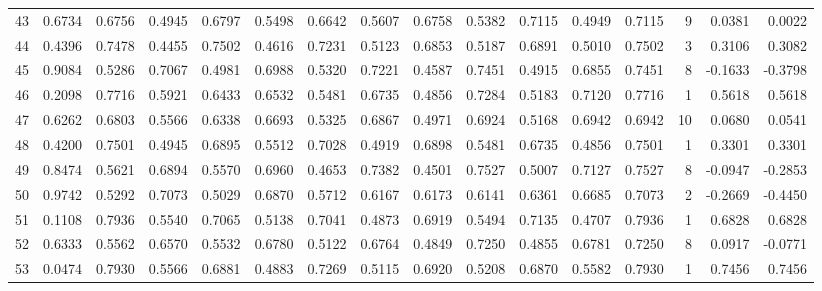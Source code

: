 \begin{tabular}{lrrrrrrrrrrrrrrr}
43  &      0.6734 &  0.6756 &  0.4945 &  0.6797 &  0.5498 &  0.6642 &  0.5607 &  0.6758 &  0.5382 &  0.7115 &   0.4949 &     0.7115 &      9 &                    0.0381 &                     0.0022 \\
44  &      0.4396 &  0.7478 &  0.4455 &  0.7502 &  0.4616 &  0.7231 &  0.5123 &  0.6853 &  0.5187 &  0.6891 &   0.5010 &     0.7502 &      3 &                    0.3106 &                     0.3082 \\
45  &      0.9084 &  0.5286 &  0.7067 &  0.4981 &  0.6988 &  0.5320 &  0.7221 &  0.4587 &  0.7451 &  0.4915 &   0.6855 &     0.7451 &      8 &                   -0.1633 &                    -0.3798 \\
46  &      0.2098 &  0.7716 &  0.5921 &  0.6433 &  0.6532 &  0.5481 &  0.6735 &  0.4856 &  0.7284 &  0.5183 &   0.7120 &     0.7716 &      1 &                    0.5618 &                     0.5618 \\
47  &      0.6262 &  0.6803 &  0.5566 &  0.6338 &  0.6693 &  0.5325 &  0.6867 &  0.4971 &  0.6924 &  0.5168 &   0.6942 &     0.6942 &     10 &                    0.0680 &                     0.0541 \\
48  &      0.4200 &  0.7501 &  0.4945 &  0.6895 &  0.5512 &  0.7028 &  0.4919 &  0.6898 &  0.5481 &  0.6735 &   0.4856 &     0.7501 &      1 &                    0.3301 &                     0.3301 \\
49  &      0.8474 &  0.5621 &  0.6894 &  0.5570 &  0.6960 &  0.4653 &  0.7382 &  0.4501 &  0.7527 &  0.5007 &   0.7127 &     0.7527 &      8 &                   -0.0947 &                    -0.2853 \\
50  &      0.9742 &  0.5292 &  0.7073 &  0.5029 &  0.6870 &  0.5712 &  0.6167 &  0.6173 &  0.6141 &  0.6361 &   0.6685 &     0.7073 &      2 &                   -0.2669 &                    -0.4450 \\
51  &      0.1108 &  0.7936 &  0.5540 &  0.7065 &  0.5138 &  0.7041 &  0.4873 &  0.6919 &  0.5494 &  0.7135 &   0.4707 &     0.7936 &      1 &                    0.6828 &                     0.6828 \\
52  &      0.6333 &  0.5562 &  0.6570 &  0.5532 &  0.6780 &  0.5122 &  0.6764 &  0.4849 &  0.7250 &  0.4855 &   0.6781 &     0.7250 &      8 &                    0.0917 &                    -0.0771 \\
53  &      0.0474 &  0.7930 &  0.5566 &  0.6881 &  0.4883 &  0.7269 &  0.5115 &  0.6920 &  0.5208 &  0.6870 &   0.5582 &     0.7930 &      1 &                    0.7456 &                     0.7456 \\

\end{tabular}

